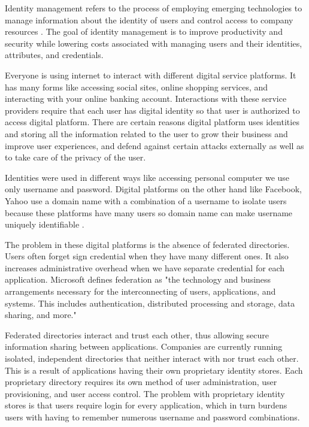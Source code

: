 Identity management refers to the process of employing emerging technologies to manage information about the identity of users and control access to company resources \cite{IdentityManagement}. The goal of identity management is to improve productivity and security while lowering costs associated with managing users and their identities, attributes, and credentials.

Everyone is using internet to interact with different digital service platforms.
It has many forms like accessing social sites, online shopping services, and interacting with your online banking account. Interactions with these service providers require that each user has digital identity so that user is authorized to access digital platform. There are certain reasons digital platform uses identities and storing all the information related to the user to grow their business and improve user experiences, and defend against certain attacks externally as well as to take care of the privacy of the user.

Identities were used in different ways like accessing personal computer we use only username and password. Digital platforms on the other hand like Facebook, Yahoo use a domain name with a combination of a username to isolate users because these platforms have many users so domain name can make username uniquely identifiable \cite{gondor2016distributed}.

The problem in these digital platforms is the absence of federated directories. Users often forget sign credential when they have many different ones. It also increases administrative overhead when we have separate credential for each application. Microsoft defines federation as "the technology and business arrangements necessary for the interconnecting of users, applications, and systems. This includes
authentication, distributed processing and storage, data sharing, and more." \cite{IdentityManagement}

Federated directories interact and trust each other, thus allowing secure information sharing between applications. Companies are currently running isolated, independent directories that neither interact with nor trust each other.
This is a result of applications having their own proprietary identity stores. Each proprietary directory requires its own method of user administration, user provisioning, and user access control. The problem with proprietary identity stores is that users require login for every application, which in turn burdens users with having to remember numerous username and password combinations.

